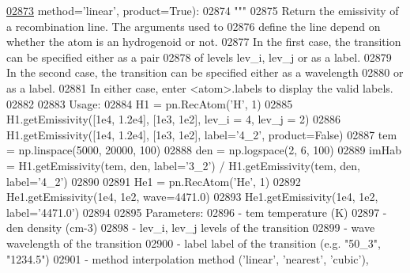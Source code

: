 \begin{DoxyCode}
\hypertarget{classpyneb_1_1core_1_1pynebcore_1_1_rec_atom_l02873}{}\hyperlink{classpyneb_1_1core_1_1pynebcore_1_1_rec_atom_ac03957666aff1955387fcc03c6187ad3}{02873}                       method=\textcolor{stringliteral}{'linear'}, product=\textcolor{keyword}{True}):
02874         \textcolor{stringliteral}{"""}
02875 \textcolor{stringliteral}{        Return the emissivity of a recombination line. The arguments used to }
02876 \textcolor{stringliteral}{        define the line depend on whether the atom is an hydrogenoid or not. }
02877 \textcolor{stringliteral}{        In the first case, the transition can be specified either as a pair }
02878 \textcolor{stringliteral}{        of levels lev\_i, lev\_j or as a label. }
02879 \textcolor{stringliteral}{        In the second case, the transition can be specified either as a wavelength }
02880 \textcolor{stringliteral}{        or as a label.}
02881 \textcolor{stringliteral}{        In either case, enter <atom>.labels to display the valid labels.}
02882 \textcolor{stringliteral}{        }
02883 \textcolor{stringliteral}{        Usage:}
02884 \textcolor{stringliteral}{            H1 = pn.RecAtom('H', 1)}
02885 \textcolor{stringliteral}{            H1.getEmissivity([1e4, 1.2e4], [1e3, 1e2], lev\_i = 4, lev\_j = 2)}
02886 \textcolor{stringliteral}{            H1.getEmissivity([1e4, 1.2e4], [1e3, 1e2], label='4\_2', product=False)}
02887 \textcolor{stringliteral}{            tem = np.linspace(5000, 20000, 100)}
02888 \textcolor{stringliteral}{            den = np.logspace(2, 6, 100)}
02889 \textcolor{stringliteral}{            imHab = H1.getEmissivity(tem, den, label='3\_2') / H1.getEmissivity(tem, den, label='4\_2')}
02890 \textcolor{stringliteral}{}
02891 \textcolor{stringliteral}{            He1 = pn.RecAtom('He', 1)}
02892 \textcolor{stringliteral}{            He1.getEmissivity(1e4, 1e2, wave=4471.0)}
02893 \textcolor{stringliteral}{            He1.getEmissivity(1e4, 1e2, label='4471.0')}
02894 \textcolor{stringliteral}{            }
02895 \textcolor{stringliteral}{        Parameters:}
02896 \textcolor{stringliteral}{            - tem            temperature (K)}
02897 \textcolor{stringliteral}{            - den            density (cm-3)}
02898 \textcolor{stringliteral}{            - lev\_i, lev\_j   levels of the transition}
02899 \textcolor{stringliteral}{            - wave           wavelength of the transition}
02900 \textcolor{stringliteral}{            - label          label of the transition (e.g. "50\_3", "1234.5")}
02901 \textcolor{stringliteral}{            - method         interpolation method ('linear', 'nearest', 'cubic'), }

\end{DoxyCode}
